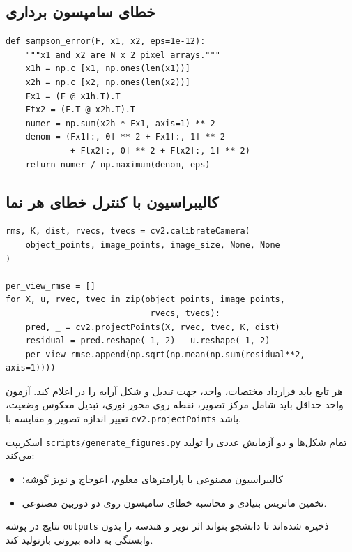 \documentclass[12pt,openany,oneside]{book}
\begin{document}
\subsection{خطای سامپسون برداری}
\begin{latin}
\begin{lstlisting}
def sampson_error(F, x1, x2, eps=1e-12):
    """x1 and x2 are N x 2 pixel arrays."""
    x1h = np.c_[x1, np.ones(len(x1))]
    x2h = np.c_[x2, np.ones(len(x2))]
    Fx1 = (F @ x1h.T).T
    Ftx2 = (F.T @ x2h.T).T
    numer = np.sum(x2h * Fx1, axis=1) ** 2
    denom = (Fx1[:, 0] ** 2 + Fx1[:, 1] ** 2
             + Ftx2[:, 0] ** 2 + Ftx2[:, 1] ** 2)
    return numer / np.maximum(denom, eps)
\end{lstlisting}
\end{latin}

\subsection{کالیبراسیون با کنترل خطای هر نما}
\begin{latin}
\begin{lstlisting}
rms, K, dist, rvecs, tvecs = cv2.calibrateCamera(
    object_points, image_points, image_size, None, None
)

per_view_rmse = []
for X, u, rvec, tvec in zip(object_points, image_points,
                             rvecs, tvecs):
    pred, _ = cv2.projectPoints(X, rvec, tvec, K, dist)
    residual = pred.reshape(-1, 2) - u.reshape(-1, 2)
    per_view_rmse.append(np.sqrt(np.mean(np.sum(residual**2, axis=1))))
\end{lstlisting}
\end{latin}

\begin{codecontract}
هر تابع باید قرارداد مختصات، واحد، جهت تبدیل و شکل آرایه را در  اعلام کند. آزمون واحد حداقل باید شامل
مرکز تصویر، نقطه روی محور نوری، تبدیل معکوس وضعیت، تغییر اندازه تصویر و مقایسه با \texttt{cv2.projectPoints} باشد.
\end{codecontract}

\begin{workshopbox}
اسکریپت \texttt{scripts/generate\_figures.py} تمام شکل‌ها و دو آزمایش عددی را تولید می‌کند:
\begin{itemize}
\item کالیبراسیون مصنوعی با پارامترهای معلوم، اعوجاج و نویز گوشه؛
\item تخمین ماتریس بنیادی و محاسبه خطای سامپسون روی دو دوربین مصنوعی.
\end{itemize}
نتایج در پوشه \texttt{outputs} ذخیره شده‌اند تا دانشجو بتواند اثر نویز و هندسه را بدون وابستگی به داده بیرونی بازتولید کند.
\end{workshopbox}
\end{document}
